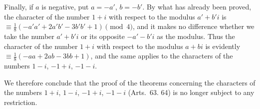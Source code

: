 Finally, if $a$ is negative, put $a=-a'$, $b=-b'$. By what has already been proved, the character of the number $1+i$ with respect to the modulus $a'+b'i$ is $\equiv\frac18(-a'a'+2a'b'-3b'b'+1)\pmod4$, and it makes no difference whether we take the number $a'+b'i$ or its opposite $-a'-b'i$ as the modulus. Thus the character of the number $1+i$ with respect to the modulus $a+bi$ is evidently $\equiv\frac18(-aa+2ab-3bb+1)$, and the same applies to the characters of the numbers $1-i$, $-1+i$, $-1-i$.

We therefore conclude that the proof of the theorems concerning the characters of the numbers $1+i$, $1-i$, $-1+i$, $-1-i$ (Arts.~63. 64) is no longer subject to any restriction.
